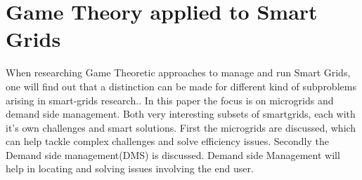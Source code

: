 \section{Game Theory applied to Smart Grids}
When researching Game Theoretic approaches to manage and run Smart Grids, one will find out that a distinction can be made for different kind of subproblems arising in smart-grids research.\cite{keypaper}. In this paper the focus is on microgrids and demand side management. Both very interesting subsets of smartgrids, each with it's own challenges and smart solutions. First the microgrids are discussed, which can help tackle complex challenges and solve efficiency issues. Secondly the Demand side management(DMS) is discussed. Demand side Management will help in locating and solving issues involving the end user. 



